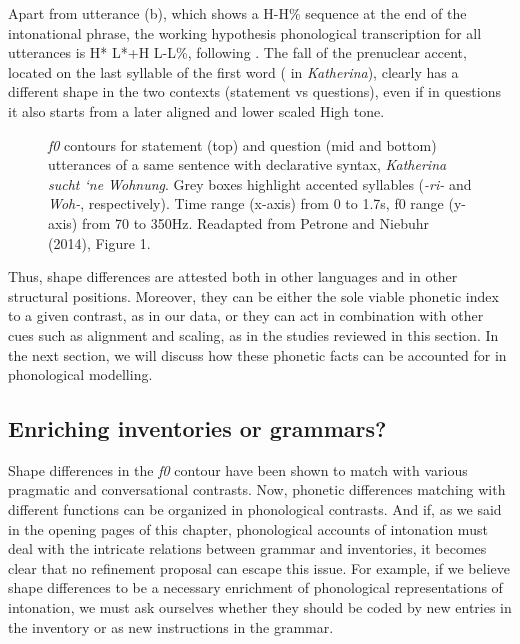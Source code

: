Apart from utterance (b), which shows a H-H\% sequence at the end of the intonational phrase, the working hypothesis phonological transcription for all utterances is H* L*+H L-L\%, following \citet{grice2002deutsche}. The fall of the prenuclear accent, located on the last syllable of the first word (\textipa{[na]} in \textit{Katherina}), clearly has a different shape in the two contexts (statement vs questions), even if in questions it also starts from a later aligned and lower scaled High tone.

\begin{figure}
\centering
{}
\caption{\textit{f0} contours for statement (top) and question (mid and bottom) utterances of a same sentence with declarative syntax, \textit{Katherina sucht `ne Wohnung}. Grey boxes highlight accented syllables (\textit{-ri-} and \textit{Woh-}, respectively). Time range (x-axis) from 0 to 1.7s, f0 range (y-axis) from 70 to 350Hz. Readapted from Petrone and Niebuhr (2014), Figure 1.}
\label{fig211}\end{figure}

Thus, shape differences are attested both in other languages and in other structural positions. Moreover, they can be either the sole viable phonetic index to a given contrast, as in our data, or they can act in combination with other cues such as alignment and scaling, as in the studies reviewed in this section. In the next section, we will discuss how these phonetic facts can be accounted for in phonological modelling.

\subsection{Enriching inventories or grammars?}\label{sec242}
Shape differences in the \textit{f0} contour have been shown to match with various pragmatic and conversational contrasts. Now, phonetic differences matching with different functions can be organized in phonological contrasts. And if, as we said in the opening pages of this chapter, phonological accounts of intonation must deal with the intricate relations between grammar and inventories, it becomes clear that no refinement proposal can escape this issue. For example, if we believe shape differences to be a necessary enrichment of phonological representations of intonation, we must ask ourselves whether they should be coded by new entries in the inventory or as new instructions in the grammar.


